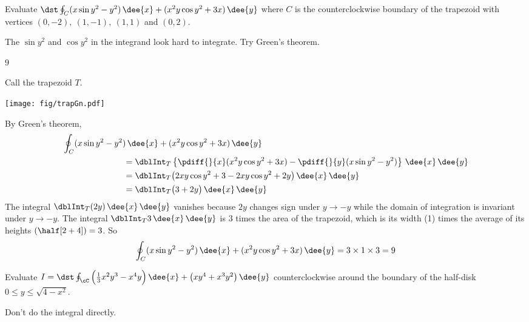 \begin{question}
Evaluate
 $\dst\oint_C (x\sin y^2 -y^2)\,\dee{x}+(x^2y\cos y^2+3x)\,\dee{y}$
where $C$ is the
counterclockwise boundary of the trapezoid with vertices $(0,-2),\ (1,-1),\
(1,1)$ and $(0,2)$.
\end{question}

\begin{hint}
The $\sin y^2$ and $\cos y^2$ in the integrand look hard to integrate.
Try Green's theorem.
\end{hint}

\begin{answer}
$9$
\end{answer}

\begin{solution}
Call the trapezoid $T$.
\begin{center}
       \texttt{[image: fig/trapGn.pdf]}
\end{center}
By Green's theorem,
\begin{align*}
&\oint_C (x\sin y^2 -y^2)\,\dee{x}+(x^2y\cos y^2+3x)\,\dee{y} \\
&\hskip1in=\dblInt_T\left\{\pdiff{}{x}(x^2y\cos y^2+3x)
-\pdiff{}{y} (x\sin y^2 -y^2)\right\}\,\dee{x}\,\dee{y}\\
&\hskip1in=\dblInt_T\big(2xy\cos y^2+3-2xy\cos y^2+2y\big)\,\dee{x}\,\dee{y}\\
&\hskip1in=\dblInt_T\big(3+2y\big)\,\dee{x}\,\dee{y}
\end{align*}
The integral $\dblInt_T(2y)\,\dee{x}\,\dee{y}$ vanishes because $2y$ changes
sign under $y\rightarrow-y$ while the domain of
integration is invariant under $y\rightarrow -y$.  The integral
$\dblInt_T 3\,\dee{x}\,\dee{y}$ is $3$ times the area of the
trapezoid, which is its width (1) times the average of its heights
$(\half[2+4])=3$. So
\begin{equation*}
\oint_C (x\sin y^2 -y^2)\,\dee{x}+(x^2y\cos y^2+3x)\,\dee{y}
               =3\times 1\times 3 = 9
\end{equation*}
\end{solution}

\begin{question}[M317 1999A] %
 Evaluate
$ I=
\dst\oint_{\cC} \Big(\frac{1}{3}x^2y^3-x^4y\Big)\,\dee{x}
+\big(xy^4+x^3y^2\big)\,\dee{y}
$
counterclockwise around the boundary of the half-disk $0\le y\le \sqrt{4-x^2}$.
\end{question}

\begin{hint}
Don't do the integral directly.
\end{hint}

